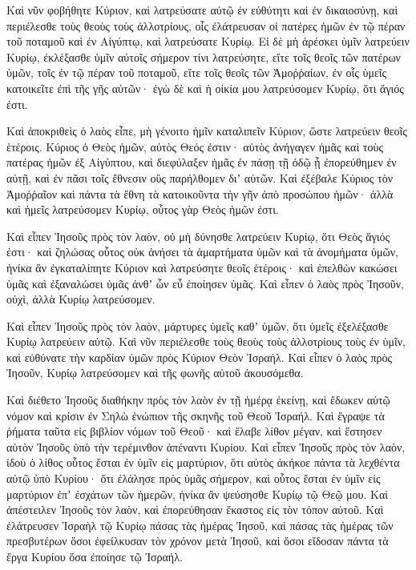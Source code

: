 {\par }{\PP {}Καὶ νῦν φοβήθητε Κύριον, καὶ λατρεύσατε αὐτῷ ἐν εὐθύτητι καὶ ἐν δικαιοσύνῃ, καὶ περιέλεσθε τοὺς θεοὺς τοὺς ἀλλοτρίους, οἷς ἐλάτρευσαν οἱ πατέρες ἡμῶν ἐν τῷ πέραν τοῦ ποταμοῦ καὶ ἐν Αἰγύπτῳ, καὶ λατρεύσατε Κυρίῳ.
Εἰ δὲ μὴ ἀρέσκει ὑμῖν λατρεύειν Κυρίῳ, ἐκλέξασθε ὑμῖν αὐτοῖς σήμερον τίνι λατρεύσητε, εἴτε τοῖς θεοῖς τῶν πατέρων ὑμῶν, τοῖς ἐν τῷ πέραν τοῦ ποταμοῦ, εἴτε τοῖς θεοῖς τῶν Ἀμοῤῥαίων, ἐν οἷς ὑμεῖς κατοικεῖτε ἐπὶ τῆς γῆς αὐτῶν· ἐγὼ δὲ καὶ ἡ οἰκία μου λατρεύσομεν Κυρίῳ, ὅτι ἅγιός ἐστι.
\par }{\PP {}Καὶ ἀποκριθεὶς ὁ λαὸς εἶπε, μὴ γένοιτο ἡμῖν καταλιπεῖν Κύριον, ὥστε λατρεύειν θεοῖς ἑτέροις.
Κύριος ὁ Θεὸς ἡμῶν, αὐτὸς Θεός ἐστιν· αὐτὸς ἀνήγαγεν ἡμᾶς καὶ τοὺς πατέρας ἡμῶν ἐξ Αἰγύπτου, καὶ διεφύλαξεν ἡμᾶς ἐν πάσῃ τῇ ὁδῷ ᾗ ἐπορεύθημεν ἐν αὐτῇ, καὶ ἐν πᾶσι τοῖς ἔθνεσιν οὓς παρήλθομεν διʼ αὐτῶν.
Καὶ ἐξέβαλε Κύριος τὸν Ἀμοῤῥαῖον καὶ πάντα τὰ ἔθνη τὰ κατοικοῦντα τὴν γῆν ἀπὸ προσώπου ἡμῶν· ἀλλὰ καὶ ἡμεῖς λατρεύσομεν Κυρίῳ, οὗτος γὰρ Θεὸς ἡμῶν ἐστι.
\par }{\PP {}Καὶ εἶπεν Ἰησοῦς πρὸς τὸν λαὸν, οὐ μὴ δύνησθε λατρεύειν Κυρίῳ, ὅτι Θεὸς ἅγιός ἐστι· καὶ ζηλώσας οὗτος οὐκ ἀνήσει τὰ ἁμαρτήματα ὑμῶν καὶ τὰ ἀνομήματα ὑμῶν,
ἡνίκα ἂν ἐγκαταλίπητε Κύριον καὶ λατρεύσητε θεοῖς ἑτέροις· καὶ ἐπελθὼν κακώσει ὑμᾶς καὶ ἐξαναλώσει ὑμᾶς ἀνθʼ ὧν εὖ ἐποίησεν ὑμᾶς.
Καὶ εἶπεν ὁ λαὸς πρὸς Ἰησοῦν, οὐχὶ, ἀλλὰ Κυρίῳ λατρεύσομεν.
\par }{\PP {}Καὶ εἶπεν Ἰησοῦς πρὸς τὸν λαὸν, μάρτυρες ὑμεῖς καθʼ ὑμῶν, ὅτι ὑμεῖς ἐξελέξασθε Κυρίῳ λατρεύειν αὐτῷ.
Καὶ νῦν περιέλεσθε τοὺς θεοὺς τοὺς ἀλλοτρίους τοὺς ἐν ὑμῖν, καὶ εὐθύνατε τὴν καρδίαν ὑμῶν πρὸς Κύριον Θεὸν Ἰσραήλ.
Καὶ εἶπεν ὁ λαὸς πρὸς Ἰησοῦν, Κυρίῳ λατρεύσομεν καὶ τῆς φωνῆς αὐτοῦ ἀκουσόμεθα.
\par }{\PP {}Καὶ διέθετο Ἰησοῦς διαθήκην πρὸς τὸν λαὸν ἐν τῇ ἡμέρᾳ ἐκείνῃ, καὶ ἔδωκεν αὐτῷ νόμον καὶ κρίσιν ἐν Σηλὼ ἐνώπιον τῆς σκηνῆς τοῦ Θεοῦ Ἰσραήλ.
Καὶ ἔγραψε τὰ ῥήματα ταῦτα εἰς βιβλίον νόμων τοῦ Θεοῦ· καὶ ἔλαβε λίθον μέγαν, καὶ ἔστησεν αὐτὸν Ἰησοῦς ὑπὸ τὴν τερέμινθον ἀπέναντι Κυρίου.
Καὶ εἶπεν Ἰησοῦς πρὸς τὸν λαὸν, ἰδοὺ ὁ λίθος οὗτος ἔσται ἐν ὑμῖν εἰς μαρτύριον, ὅτι αὐτὸς ἀκήκοε πάντα τὰ λεχθέντα αὐτῷ ὑπὸ Κυρίου· ὅτι ἐλάλησε πρὸς ὑμᾶς σήμερον, καὶ οὗτος ἔσται ἐν ὑμῖν εἰς μαρτύριον ἐπʼ ἐσχάτων τῶν ἡμερῶν, ἡνίκα ἂν ψεύσησθε Κυρίῳ τῷ Θεῷ μου.
Καὶ ἀπέστειλεν Ἰησοῦς τὸν λαὸν, καὶ ἐπορεύθησαν ἕκαστος εἰς τὸν τόπον αὐτοῦ.
Καὶ ἐλάτρευσεν Ἰσραὴλ τῷ Κυρίῳ πάσας τὰς ἡμέρας Ἰησοῦ, καὶ πάσας τὰς ἡμέρας τῶν πρεσβυτέρων ὅσοι ἐφείλκυσαν τὸν χρόνον μετὰ Ἰησοῦ, καὶ ὅσοι εἴδοσαν πάντα τὰ ἔργα Κυρίου ὅσα ἐποίησε τῷ Ἰσραήλ.
}
